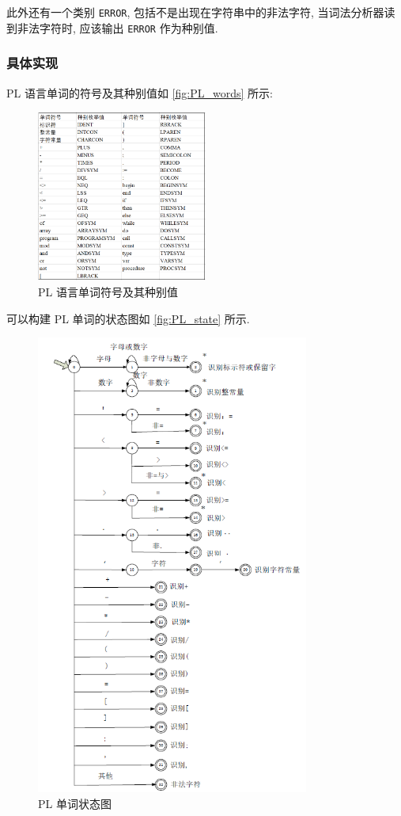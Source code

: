 此外还有一个类别 \texttt{ERROR}, 包括不是出现在字符串中的非法字符,  当词法分析器读到非法字符时, 应该输出 \texttt{ERROR} 作为种别值.

\subsubsection{具体实现}

PL 语言单词的符号及其种别值如 \autoref{fig:PL_words} 所示: \begin{figure}[htbp]
    \centering
    \includegraphics[width=0.5\textwidth]{images/PL_words.png}
    \caption{PL 语言单词符号及其种别值}
    \label{fig:PL_words}
\end{figure}

可以构建 PL 单词的状态图如 \autoref{fig:PL_state} 所示. \begin{figure}[htbp]
    \centering
    \includegraphics[width=0.8\textwidth]{images/PL_state.png}
    \caption{PL 单词状态图}
    \label{fig:PL_state}
\end{figure}

